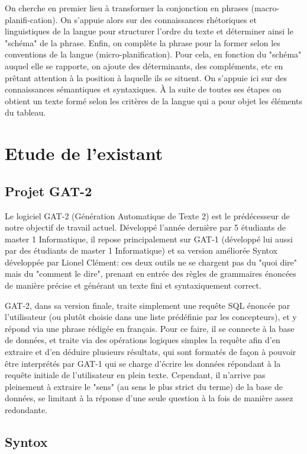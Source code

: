 \documentclass[12pt]{report}
\begin{document}
On cherche en premier lieu à transformer la conjonction en phrases (macro-planifi-cation).  On s'appuie alors sur des connaissances rhétoriques et linguistiques de la langue pour structurer l'ordre du texte et déterminer ainsi le "schéma" de la phrase. Enfin, on complète la phrase pour la former selon les conventions de la langue (micro-planification). Pour cela, en fonction du "schéma" auquel elle se rapporte, on ajoute des déterminants, des compléments, etc en prêtant attention à la position à laquelle ils se situent. On s'appuie ici sur des connaissances sémantiques et syntaxiques.  À la suite de toutes ses étapes on obtient un texte formé selon les critères de la langue qui a pour objet les éléments du tableau. 


\section{Etude de l'existant}

\subsection{Projet GAT-2}

Le logiciel GAT-2 (Génération Automatique de Texte 2) \cite{GAT2} est le prédécesseur de notre objectif de travail actuel. Développé l'année dernière par 5 étudiants de master 1 Informatique, il repose principalement sur GAT-1 (développé lui aussi par des étudiants de master 1 Informatique) et sa version améliorée Syntox développée par Lionel Clément: ces deux outils ne se chargent pas du "quoi dire" mais du "comment le dire", prenant en entrée des règles de grammaires énoncées de manière précise et générant un texte fini et syntaxiquement correct.

GAT-2, dans sa version finale, traite simplement une requête SQL énoncée par l'utilisateur (ou plutôt choisie dans une liste prédéfinie par les concepteurs), et y répond via une phrase rédigée en français. Pour ce faire, il se connecte à la base de données, et traite via des opérations logiques simples la requête afin d'en extraire et d'en déduire plusieurs résultats, qui sont formatés de façon à pouvoir être interprétés par GAT-1 qui se charge d'écrire les données répondant à la requête initiale de l'utilisateur en plein texte.
Cependant, il n'arrive pas pleinement à extraire le "sens" (au sens le plus strict du terme) de la base de données, se limitant à la réponse d'une seule question à la fois de manière assez redondante.

\subsection{Syntox}
\end{document}
